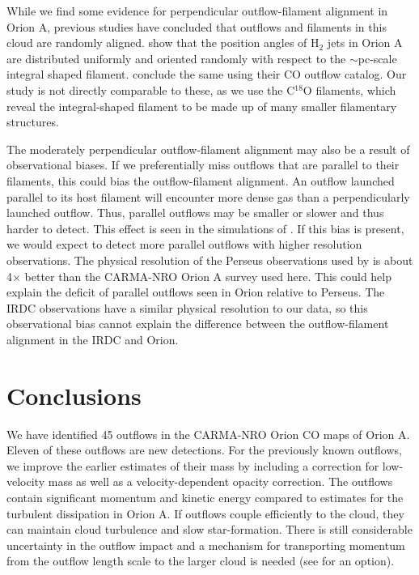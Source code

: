 \documentclass[twocolumn]{aastex63}
\begin{document}
While we find some evidence for perpendicular outflow-filament alignment in Orion A, previous studies have concluded that outflows and filaments in this cloud are randomly aligned. \citet{Davis09} show that the position angles of H$_2$ jets in Orion A are distributed uniformly and oriented randomly with respect to the $\sim$pc-scale integral shaped filament. \citet{Tanabe19} conclude the same using their CO outflow catalog. Our study is not directly comparable to these, as we use the C$^{18}$O filaments, which reveal the integral-shaped filament to be made up of many smaller filamentary structures.

The moderately perpendicular outflow-filament alignment may also be a result of observational biases. If we preferentially miss outflows that are parallel to their filaments, this could bias the outflow-filament alignment. An outflow launched parallel to its host filament will encounter more dense gas than a perpendicularly launched outflow. Thus, parallel outflows may be smaller or slower and thus harder to detect. This effect is seen in the simulations of \citet{Offner11}. If this bias is present, we would expect to detect more parallel outflows with higher resolution observations. The physical resolution of the Perseus observations used by \citet{Stephens17} is about 4$\times$ better than the CARMA-NRO Orion A survey used here. This could help explain the deficit of parallel outflows seen in Orion relative to Perseus. The \cite{Kong19} IRDC observations have a similar physical resolution to our data, so this observational bias cannot explain the difference between the outflow-filament alignment in the IRDC and Orion.

\section{Conclusions}\label{sec:conclusions}

We have identified 45 outflows in the CARMA-NRO Orion CO maps of Orion A. Eleven of these outflows are new detections. For the previously known outflows, we improve the earlier estimates of their mass by including a correction for low-velocity mass as well as a velocity-dependent opacity correction.
The outflows contain significant momentum and kinetic energy compared to estimates for the turbulent dissipation in Orion A. If outflows couple efficiently to the cloud, they can maintain cloud turbulence and slow star-formation. There is still considerable uncertainty in the outflow impact and a mechanism for transporting momentum from the outflow length scale to the larger cloud is needed (see \citealt{Offner18} for an option).
\end{document}
